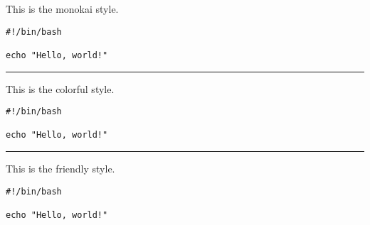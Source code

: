 \documentclass{article}
\begin{document}
\begin{center}

This is the {\ttfamily monokai} style.

\begin{verbatim}
#!/bin/bash

echo "Hello, world!"
\end{verbatim}

\hrule
\vspace{6pt}

This is the {\ttfamily colorful} style.

\begin{verbatim}
#!/bin/bash

echo "Hello, world!"
\end{verbatim}

\hrule
\vspace{6pt}

This is the {\ttfamily friendly} style.

\begin{verbatim}
#!/bin/bash

echo "Hello, world!"
\end{verbatim}
\end{center}
\end{document}
